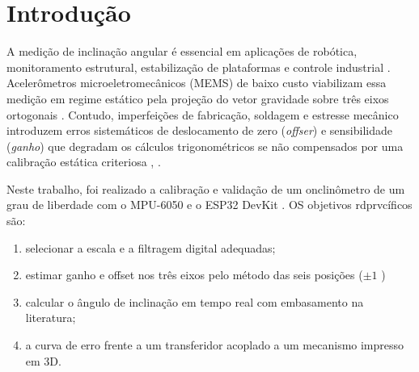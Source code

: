 \section{Introdução}

A medição de inclinação angular é essencial em aplicações de robótica, monitoramento estrutural, estabilização de plataformas e controle industrial \cite{1.doebelin2004}. Acelerômetros microeletromecânicos (MEMS) de baixo custo
viabilizam essa medição em regime estático pela projeção do vetor gravidade sobre três eixos ortogonais \cite{2.pedley2013}. Contudo, imperfeições de fabricação, soldagem e estresse mecânico introduzem erros sistemáticos de deslocamento de zero (\textit{offser}) e sensibilidade (\textit{ganho}) que degradam os cálculos trigonométricos se não compensados por uma calibração estática criteriosa \cite{3.fisher2010}, \cite{4.ochoa2026}.

Neste trabalho, foi realizado a calibração e validação de um onclinômetro de um grau de liberdade com o MPU-6050 e o ESP32 DevKit \cite{4.ochoa2026}. OS objetivos rdprvcíficos são: 

\begin{enumerate}
    \item selecionar a escala e a filtragem digital adequadas;

    \item estimar ganho e offset nos três eixos pelo método das seis posições ($\pm 1$ )

    \item calcular o ângulo de inclinação em tempo real com embasamento na literatura;

    \item a curva de erro frente a um transferidor acoplado a um mecanismo impresso em 3D.
\end{enumerate}